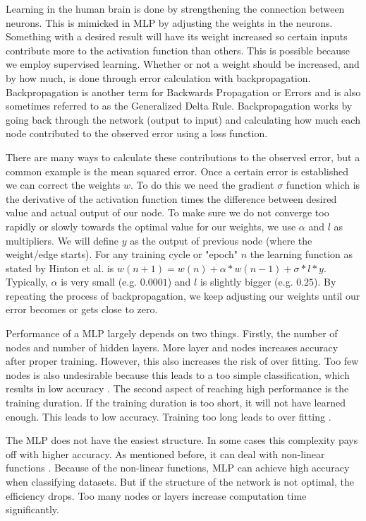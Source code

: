 Learning in the human brain is done by strengthening the connection between neurons. This is mimicked in MLP by adjusting the weights in the neurons. Something with a desired result will have its weight increased so certain inputs contribute more to the activation function than others. This is possible because we employ supervised learning. Whether or not a weight should be increased, and by how much, is done through error calculation with backpropagation. Backpropagation is another term for Backwards Propagation or Errors \cite{rumelhart1985learning} and is also sometimes referred to as the Generalized Delta Rule. Backpropagation works by going back through the network (output to input) and calculating how much each node contributed to the observed error using a loss function. 

There are many ways to calculate these contributions to the observed error, but a common example is the mean squared error. Once a certain error is established we can correct the weights $w$. To do this we need the gradient $\sigma$ function which is the derivative of the activation function times the difference between desired value and actual output of our node. To make sure we do not converge too rapidly or slowly towards the optimal value for our weights, we use $\alpha$ and $l$ as multipliers. We will define $y$ as the output of previous node (where the weight/edge starts). For any training cycle or "epoch" $n$ the learning function as stated by Hinton et al. is $w(n+1)=w(n) + \alpha * w(n-1) + \sigma * l * y$. Typically, $\alpha$ is very small (e.g. $0.0001$) and $l$ is slightly bigger (e.g. $0.25$). By repeating the process of backpropagation, we keep adjusting our weights until our error becomes or gets close to zero.

Performance of a MLP largely depends on two things. Firstly, the number of nodes and number of hidden layers. More layer and nodes increases accuracy after proper training. However, this also increases the risk of over fitting. Too few nodes is also undesirable because this leads to a too simple classification, which results in low accuracy \cite{Murtagh1991183}. 
The second aspect of reaching high performance is the training duration. If the training duration is too short, it will not have learned enough. This leads to low accuracy. Training too long leads to over fitting \cite{caruana2001overfitting}. 

The MLP does not have the easiest structure. In some cases this complexity pays off with higher accuracy. As mentioned before, it can deal with non-linear functions \cite{gardner1998artificial}. Because of the non-linear functions, MLP can achieve high accuracy when classifying datasets. But if the structure of the network is not optimal, the efficiency drops. Too many nodes or layers increase computation time significantly.